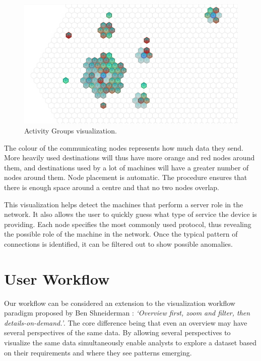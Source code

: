 \begin{figure}[htb]
   \centering
   \includegraphics[width=\linewidth]{materials/groups.jpg}
   \caption[Activity Groups]{\label{fig:groups}
         Activity Groups visualization.}
\end{figure}

The colour of the communicating nodes represents how much data they send. More heavily used
destinations will thus have more orange and red nodes around them, and destinations used by a lot of
machines will have a greater number of nodes around them. Node placement is automatic. The procedure
ensures that there is enough space around a centre and that no two nodes overlap.

This visualization helps detect the machines that perform a server role in the network.
It also allows the user to quickly guess what type of service the device is providing. Each node
specifies the most commonly used protocol, thus revealing the possible role of the machine in the
network. Once the typical pattern of connections is identified, it can be filtered out to show
possible anomalies.


\section{User Workflow} \label{sec:workflow}
%
Our workflow can be considered an extension to the visualization workflow paradigm proposed by Ben
Shneiderman \cite{shneiderman1996designing}: \textit{`Overview first, zoom and filter, then
details-on-demand.'}. The core difference being that even an overview may have several perspectives
of the same data. By allowing several perspectives to visualize the same data simultaneously enable
analysts to explore a dataset based on their requirements and where they see patterns emerging. 

